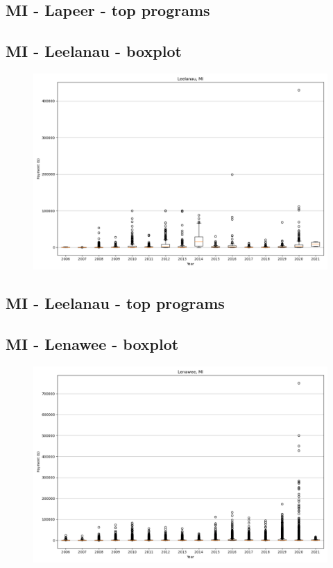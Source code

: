 \subsection*{MI - Lapeer - top programs}

\newpage
\subsection*{MI - Leelanau - boxplot}
\begin{figure}[h]
\centering
\includegraphics[width=7in]{../output/boxplots/counties/Leelanau-MI_boxplot.png}
\end{figure}


\subsection*{MI - Leelanau - top programs}

\newpage
\subsection*{MI - Lenawee - boxplot}
\begin{figure}[h]
\centering
\includegraphics[width=7in]{../output/boxplots/counties/Lenawee-MI_boxplot.png}
\end{figure}


